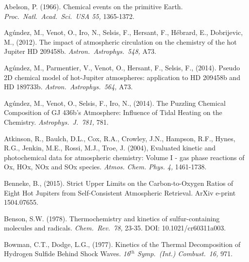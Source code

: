 \documentclass[preprint]{aastex6}
\newcounter{reaction}
\begin{document}

\begin{thebibliography}{00}

Abelson, P. (1966).
Chemical events on the primitive Earth.
{\em Proc.\ Natl.\ Acad.\ Sci.\ USA 55,} 1365-1372.

Ag{\'u}ndez, M., Venot, O., Iro, N., Selsis, F., Hersant, F., H{\'e}brard, E., Dobrijevic, M., (2012).
The impact of atmospheric circulation on the chemistry of the hot Jupiter HD 209458b.
{\em Astron.\ Astrophys.\ 548,} A73.

Ag{\'u}ndez, M., Parmentier, V., Venot, O., Hersant, F., Selsis, F., (2014).
Pseudo 2D chemical model of hot-Jupiter atmospheres: application to HD 209458b and HD 189733b.
{\em Astron.\ Astrophys.\ 564,} A73.

Ag{\'u}ndez, M., Venot, O., Selsis, F., Iro, N., (2014).
 The Puzzling Chemical Composition of GJ 436b's Atmosphere: Influence of Tidal Heating on the Chemistry.
{\em Astrophys.\ J.\  781,} 781.


Atkinson, R., Baulch, D.L., Cox, R.A., Crowley, J.N., Hampson, R.F., Hynes, R.G., Jenkin, M.E., Rossi, M.J., Troe, J. (2004),
 Evaluated kinetic and photochemical data for atmospheric chemistry: Volume I - gas phase reactions of Ox, HOx, NOx and SOx species. 
 {\it Atmos. Chem. Phys.  4,} 1461-1738.

  Benneke, B., (2015).
  Strict Upper Limits on the Carbon-to-Oxygen Ratios of Eight Hot Jupiters from Self-Consistent Atmospheric Retrieval.
  ArXiv e-print 1504.07655.

Benson, S.W. (1978).
Thermochemistry and kinetics of sulfur-containing molecules and radicals.
{\em Chem.\ Rev.\ 78,} 23-35.  DOI: 10.1021/cr60311a003.

Bowman, C.T., Dodge, L.G., (1977).
Kinetics of the Thermal Decomposition of Hydrogen Sulfide Behind Shock Waves.
{\em 16$^{th}$ Symp.\ (Int.) Combust.\ 16,} 971.


\end{thebibliography}
\end{document}
